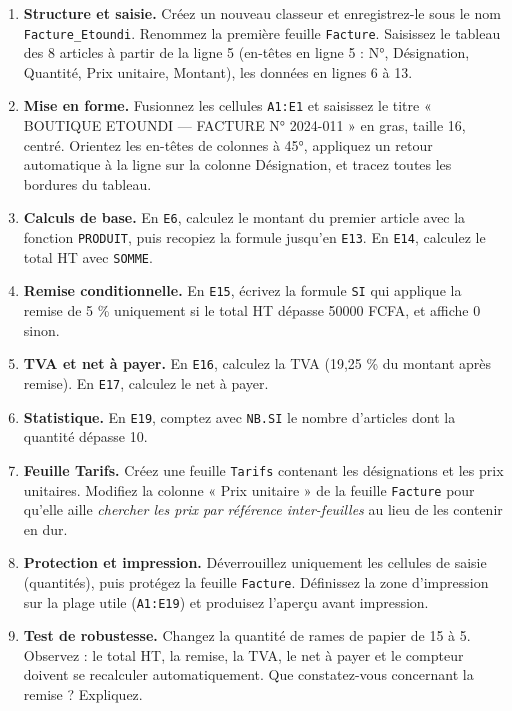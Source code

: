\documentclass[11pt]{article}
\begin{document}
\begin{enumerate}
\item \textbf{Structure et saisie.} Créez un nouveau classeur et enregistrez-le sous le nom \texttt{Facture\_Etoundi}. Renommez la première feuille \texttt{Facture}. Saisissez le tableau des 8 articles à partir de la ligne 5 (en-têtes en ligne 5 : N°, Désignation, Quantité, Prix unitaire, Montant), les données en lignes 6 à 13.
\item \textbf{Mise en forme.} Fusionnez les cellules \texttt{A1:E1} et saisissez le titre « BOUTIQUE ETOUNDI — FACTURE N° 2024-011 » en gras, taille 16, centré. Orientez les en-têtes de colonnes à 45°, appliquez un retour automatique à la ligne sur la colonne Désignation, et tracez toutes les bordures du tableau.
\item \textbf{Calculs de base.} En \texttt{E6}, calculez le montant du premier article avec la fonction \texttt{PRODUIT}, puis recopiez la formule jusqu'en \texttt{E13}. En \texttt{E14}, calculez le total HT avec \texttt{SOMME}.
\item \textbf{Remise conditionnelle.} En \texttt{E15}, écrivez la formule \texttt{SI} qui applique la remise de 5 \% uniquement si le total HT dépasse \num{50000} FCFA, et affiche 0 sinon.
\item \textbf{TVA et net à payer.} En \texttt{E16}, calculez la TVA (19,25 \% du montant après remise). En \texttt{E17}, calculez le net à payer.
\item \textbf{Statistique.} En \texttt{E19}, comptez avec \texttt{NB.SI} le nombre d'articles dont la quantité dépasse 10.
\item \textbf{Feuille Tarifs.} Créez une feuille \texttt{Tarifs} contenant les désignations et les prix unitaires. Modifiez la colonne « Prix unitaire » de la feuille \texttt{Facture} pour qu'elle aille \emph{chercher les prix par référence inter-feuilles} au lieu de les contenir en dur.
\item \textbf{Protection et impression.} Déverrouillez uniquement les cellules de saisie (quantités), puis protégez la feuille \texttt{Facture}. Définissez la zone d'impression sur la plage utile (\texttt{A1:E19}) et produisez l'aperçu avant impression.
\item \textbf{Test de robustesse.} Changez la quantité de rames de papier de 15 à 5. Observez : le total HT, la remise, la TVA, le net à payer et le compteur doivent se recalculer automatiquement. Que constatez-vous concernant la remise ? Expliquez.
\end{enumerate}
\end{document}
